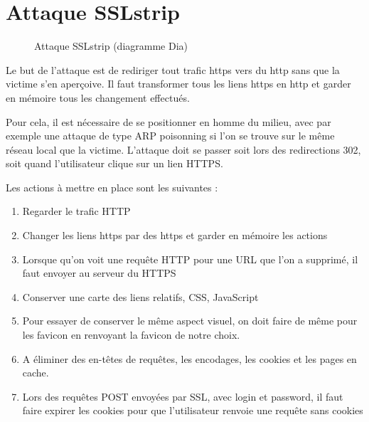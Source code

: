 \chapter{Attaque SSLstrip}

\label{sec:sslstrip}

\begin{figure}[H]
  \caption{Attaque SSLstrip (diagramme Dia)}
\end{figure}

Le but de l'attaque est de rediriger tout trafic https vers du http sans que la victime s'en aperçoive. Il faut transformer tous les liens https en http et garder en mémoire tous les changement effectués.

Pour cela, il est nécessaire de se positionner en homme du milieu, avec par exemple une attaque de type ARP poisonning si l'on se trouve sur le même réseau local que la victime. L'attaque doit se passer soit lors des redirections 302, soit quand l'utilisateur clique sur un lien HTTPS.

Les actions à mettre en place sont les suivantes :

\begin{enumerate}
\item Regarder le trafic HTTP
\item Changer les liens https par des https et garder en mémoire les actions
\item Lorsque qu'on voit une requête HTTP pour une URL que l'on a supprimé, il faut envoyer au serveur du HTTPS
\item Conserver une carte des liens relatifs, CSS, JavaScript
\item Pour essayer de conserver le même aspect visuel, on doit faire de même pour les favicon en renvoyant la favicon de notre choix.
\item A éliminer des en-têtes de requêtes, les encodages, les cookies et les pages en cache.
\item Lors des requêtes POST envoyées par SSL, avec login et password, il faut faire expirer les cookies pour que l'utilisateur renvoie une requête sans cookies
\end{enumerate}

